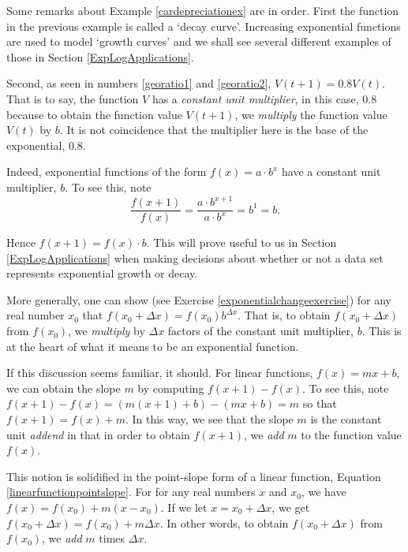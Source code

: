 \documentclass{ximera}
\begin{document}
Some remarks about Example \ref{cardepreciationex} are in order.  First the function in the previous example is  called a `decay curve'.  Increasing exponential functions are used to model `growth curves' and we shall see several different examples of those in Section \ref{ExpLogApplications}.  

 

Second, as seen in numbers \ref{georatio1} and \ref{georatio2},  $V(t+1) = 0.8 V(t)$.  That is to say, the function $V$ has a \textit{constant unit multiplier}, in this case, $0.8$ because to obtain the function value $V(t+1)$, we \textit{multiply} the function value $V(t)$ by $b$.   It is not coincidence that the multiplier here is the base of the exponential, $0.8$.

 

Indeed, exponential functions of the form $f(x) = a \cdot b^{x}$  have a constant unit multiplier, $b$.  To see this,  note \[ \frac{f(x+1)}{f(x)} = \frac{a \cdot b^{x+1}}{ a \cdot b^{x}} = b^{1} = b.\]

Hence $f(x+1) = f(x) \cdot b$.  This will prove useful to us in Section \ref{ExpLogApplications} when making decisions about whether or not a data set represents exponential growth or decay.  

 

More generally, one can show (see Exercise \ref{exponentialchangeexercise}) for any real number $x_{0}$ that $f(x_{0}+\Delta x) = f(x_{0}) b^{\Delta x}$. That is, to obtain $f(x_{0} + \Delta x)$ from $f(x_{0})$, we \textit{multiply} by $\Delta x$ factors of the constant unit multiplier, $b$.  This is at the heart of what it means to be an exponential function.

 

If this discussion seems familiar, it should.  For linear functions, $f(x) = mx +b$, we can obtain the slope $m$ by computing $f(x+1) - f(x)$.  To see this, note $f(x+1) - f(x)  = (m(x+1) +b) - (mx+b) = m$ so that $f(x+1) = f(x) + m$.  In this way, we see that the slope $m$ is the constant unit \textit{addend} in that in order to obtain $f(x+1)$, we \textit{add} $m$ to the function value $f(x)$.  

 

This notion is solidified in the point-slope form of a linear function,  Equation \ref{linearfunctionpointslope}.  For for any real numbers $x$ and $x_{0}$, we have   $f(x) = f(x_{0}) + m(x-x_{0})$.  If we let $x = x_{0}+ \Delta x$, we get $f(x_{0}+ \Delta x) = f(x_{0}) + m \Delta x$.  In other words, to obtain $f(x_{0}+\Delta x)$ from $f(x_{0})$, we \textit{add} $m$ times $\Delta x$. 
\end{document}
